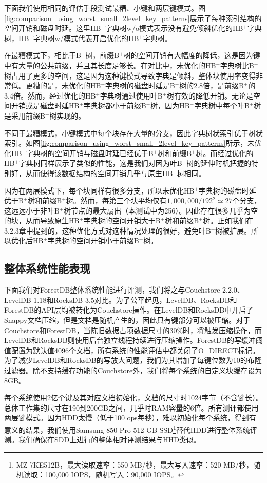 下面我们使用相同的评估手段测试最糟、小键和两层键模式。图\ref{fig:comparison_using_worst_small_2level_key_patterns}展示了每种索引结构的空间开销和磁盘时延。这里HB$^+$字典树w/o模式表示没有避免倾斜优化的HB$^+$字典树，HB$^+$字典树w/模式代表开启优化的HB$^+$字典树。

在最糟模式下，相比于B$^+$树，前缀B$^+$树的空间开销有大幅度的降低，这是因为键中有大量的公共前缀，并且其长度足够长。在对比中，未优化的HB$^+$字典树比B$^+$树占用了更多的空间，这是因为这种键模式导致字典是倾斜，整体块使用率变得非常低。更糟的是，未优化的HB$^+$字典树的磁盘时延是B$^+$树的2.8倍，是前缀B$^+$的3.4倍。然而，经过优化的HB$^+$字典树通过使用叶B$^+$树有效的降低开销。无论是空间开销或是磁盘时延HB$^+$字典树都小于前缀B$^+$树，因为HB$^+$字典树中每个叶B$^+$树是采用前缀B$^+$树实现的。

不同于最糟模式，小键模式中每个块存在大量的分支，因此字典树状索引优于树状索引。如图\ref{fig:comparison_using_worst_small_2level_key_patterns}所示，未优化HB$^+$字典树的空间开销与磁盘时延已经优于B$^+$树和前缀B$^+$树。而经过优化的HB$^+$字典树同样展示了类似的性能，这是我们对因为叶B$^+$树的延伸时机把握的特别好，从而使得该数据结构的空间开销几乎与原生HB$^+$树相同。

因为在两层模式下，每个块同样有很多分支，所以未优化HB$^+$字典树的磁盘时延优于B$^+$树和前缀B$^+$树。然而，每第三个块平均仅有$1,000,000/192^2\simeq27$个分支，这远远小于非叶B$^+$树节点的最大扇出（本测试中为256）。因此存在很多几乎为空的块，从而导致原生HB$^+$字典树的空间开销大于B$^+$树和前缀B$^+$树。正如我们在3.2.3章中提到的，这种优化方式对这种情况处理的很好，避免叶B$^+$树被扩展。所以优化后HB$^+$字典树的空间开销小于前缀B$^+$树。

\subsection{整体系统性能表现}

下面我们对ForestDB整体系统性能进行评测，我们将之与Couchstore 2.2.0、LevelDB 1.18和RocksDB 3.5对比。为了公平起见，LevelDB、RocksDB和ForestDB的API层均被转化为Couchstore操作。在LevelDB和RocksDB中开启了Snappy文档压缩，但是文档是随机产生的，因此只有键部分可以被压缩。对于Couchstore和ForestDB，当陈旧数据占项数据尺寸的30\%时，将触发压缩操作，而LevelDB和RocksDB则使用后台独立线程持续进行压缩操作。ForestDB的写缓冲阈值配置为默认值4096个文档，所有系统的性能评估中都关闭了O\_DIRECT标记。为了减少LevelDB和RocksDB的写放大问题，我们为其增加了每键位数为10的布隆过滤器。除不支持缓存功能的Couchstore外，我们将每个系统的自定义块缓存设为8GB。

每个系统使用2亿个键及其对应文档初始化，文档的尺寸时1024字节（不含键长）。总体工作集的尺寸在190到200GB之间，几乎时RAM容量的6倍。所有测评都使用两层键模式。因为HDD太慢（低于100 ops每秒），难以初始化每个系统，得到有意义的结果，我们使用Samsung 850 Pro 512 GB SSD\footnote{MZ-7KE512B，最大读取速率：550 MB/秒，最大写入速率：520 MB/秒，随机读取：100,000 IOPS，随机写入：90,000 IOPS。}替代HDD进行整体系统评测。我们确保在SDD上进行的整体相对评测结果与HHD类似。


